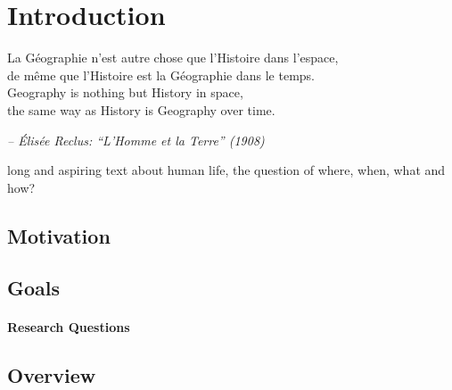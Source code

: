 
\section{Introduction} %
\label{sec:introduction}

\begin{quoteit}
\large
La Géographie n’est autre chose que l’Histoire dans l’espace, \\
de même que l’Histoire est la Géographie dans le temps. \\

Geography is nothing but History in space, \\
the same way as History is Geography over time.
\end{quoteit}
\hfill \textit{-- Élisée Reclus: ``L'Homme et la Terre'' (1908)}

long and aspiring text about human life, the question of where, when, what and how?



\subsection{Motivation} %
\label{sub:motivation}




\subsection{Goals} %
\label{sub:goals}



\paragraph{Research Questions} %
\label{par:research_questions}






\subsection{Overview} %
\label{sub:overview}




